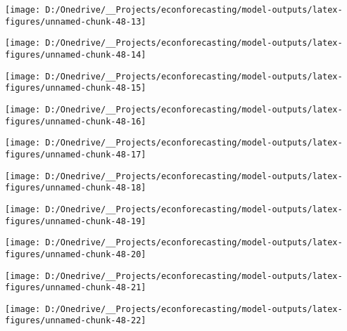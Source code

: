 \documentclass[11pt, letterpaper]{article}\usepackage[]{graphicx}\usepackage[]{color}
\begin{document}
{\centering \texttt{[image: D:/Onedrive/\_\_Projects/econforecasting/model-outputs/latex-figures/unnamed-chunk-48-13]} 

}




{\centering \texttt{[image: D:/Onedrive/\_\_Projects/econforecasting/model-outputs/latex-figures/unnamed-chunk-48-14]} 

}




{\centering \texttt{[image: D:/Onedrive/\_\_Projects/econforecasting/model-outputs/latex-figures/unnamed-chunk-48-15]} 

}




{\centering \texttt{[image: D:/Onedrive/\_\_Projects/econforecasting/model-outputs/latex-figures/unnamed-chunk-48-16]} 

}




{\centering \texttt{[image: D:/Onedrive/\_\_Projects/econforecasting/model-outputs/latex-figures/unnamed-chunk-48-17]} 

}




{\centering \texttt{[image: D:/Onedrive/\_\_Projects/econforecasting/model-outputs/latex-figures/unnamed-chunk-48-18]} 

}




{\centering \texttt{[image: D:/Onedrive/\_\_Projects/econforecasting/model-outputs/latex-figures/unnamed-chunk-48-19]} 

}




{\centering \texttt{[image: D:/Onedrive/\_\_Projects/econforecasting/model-outputs/latex-figures/unnamed-chunk-48-20]} 

}




{\centering \texttt{[image: D:/Onedrive/\_\_Projects/econforecasting/model-outputs/latex-figures/unnamed-chunk-48-21]} 

}




{\centering \texttt{[image: D:/Onedrive/\_\_Projects/econforecasting/model-outputs/latex-figures/unnamed-chunk-48-22]} 

}
\end{document}

